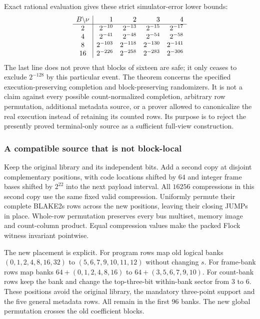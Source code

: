 Exact rational evaluation gives these strict simulator-error lower bounds:
\[
\begin{array}{c|rrrr}
 B\backslash\nu&1&2&3&4\\\hline
 2&2^{-10}&2^{-13}&2^{-15}&2^{-17}\\
 4&2^{-41}&2^{-48}&2^{-54}&2^{-58}\\
 8&2^{-103}&2^{-118}&2^{-130}&2^{-141}\\
 16&2^{-226}&2^{-258}&2^{-283}&2^{-306}
\end{array}
\]
The last line does not prove that blocks of sixteen are safe; it only ceases to exclude $2^{-128}$ by this particular event. The theorem concerns the specified execution-preserving completion and block-preserving randomizers. It is not a claim against every possible count-normalized completion, arbitrary row permutation, additional metadata source, or a prover allowed to canonicalize the real execution instead of retaining its counted rows. Its purpose is to reject the presently proved terminal-only source as a sufficient full-view construction.

\subsubsection{A compatible source that is not block-local}

Keep the original library and its independent bits. Add a second copy at disjoint complementary positions, with code locations shifted by $64$ and integer frame bases shifted by $2^{22}$ into the next payload interval. All $16256$ compressions in this second copy use the same fixed valid compression. Uniformly permute their complete BLAKE2s rows across the new positions, leaving their closing JUMPs in place. Whole-row permutation preserves every bus multiset, memory image and count-column product. Equal compression values make the packed Flock witness invariant pointwise.

The new placement is explicit. For program rows map old logical banks $(0,1,2,4,8,16,32)$ to $(5,6,7,9,10,11,12)$ without changing $s$. For frame-bank rows map banks $64+(0,1,2,4,8,16)$ to $64+(3,5,6,7,9,10)$. For count-bank rows keep the bank and change the top-three-bit within-bank sector from $3$ to $6$. These positions avoid the original library, the mandatory three-point support and the five general metadata rows. All remain in the first $96$ banks. The new global permutation crosses the old coefficient blocks.

